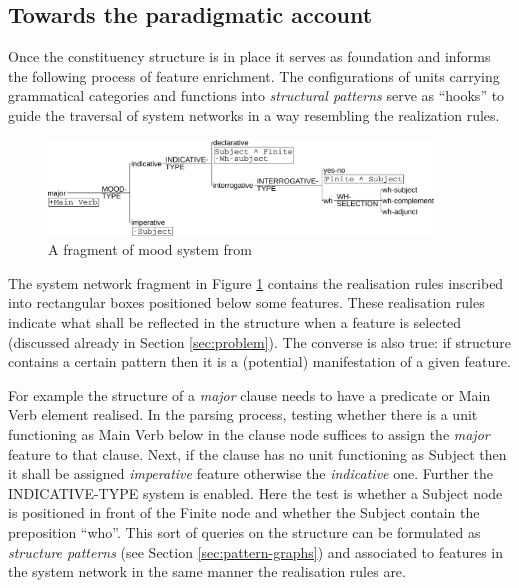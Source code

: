 
\subsection{Towards the paradigmatic account}
\label{sec:paradigmatic-account}
Once the constituency structure is in place it serves as foundation and informs the following process of feature enrichment. The configurations of units carrying grammatical categories and functions into \textit{structural patterns} serve as ``hooks'' to guide the traversal of system networks in a way resembling the realization rules. %

\begin{figure}[!ht]
    \centering      
    \includegraphics[width=0.91\textwidth]{Figures/Example/just-mood.pdf}      
    \caption{A fragment of mood system from \citet[366]{Halliday2013}}
    \label{fig:just-mood}
\end{figure}

The system network fragment in Figure \ref{fig:just-mood} contains the realisation rules inscribed into rectangular boxes positioned below some features. These realisation rules indicate what shall be reflected in the structure when a feature is selected (discussed already in Section \ref{sec:problem}). The converse is also true: if structure contains a certain pattern then it is a (potential) manifestation of a given feature. 

For example the structure of a \textit{major} clause needs to have a predicate or Main Verb element realised. In the parsing process, testing whether there is a unit functioning as Main Verb below in the clause node suffices to assign the \textit{major} feature to that clause. Next, if the clause has no unit functioning as Subject then it shall be assigned \textit{imperative} feature otherwise the \textit{indicative} one. Further the INDICATIVE-TYPE system is enabled. Here the test is whether a Subject node is positioned in front of the Finite node and whether the Subject contain the preposition ``who''. This sort of queries on the structure can be formulated as \textit{structure patterns} (see Section \ref{sec:pattern-graphs}) and associated to features in the system network in the same manner the realisation rules are. 

